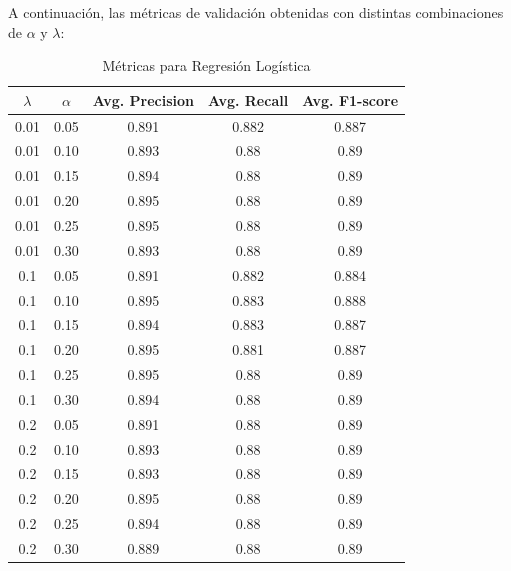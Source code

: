 \documentclass[conference]{IEEEtran}
\begin{document}
A continuación, las métricas de validación obtenidas con distintas combinaciones de $\alpha$ y $\lambda$:

\begin{table}[ht]
    \centering
    \begin{tabular}{ccccc}
        \(\lambda\) & \(\alpha\) & \textbf{Avg. Precision} & \textbf{Avg. Recall} & \textbf{Avg. F1-score} \\
        \hline
        0.01 & 0.05 & 0.891 & 0.882 & 0.887 \\
        0.01 & 0.10 & 0.893 & 0.88 & 0.89 \\
        0.01 & 0.15 & 0.894 & 0.88 & 0.89 \\
        0.01 & 0.20 & 0.895 & 0.88 & 0.89 \\
        0.01 & 0.25 & 0.895 & 0.88 & 0.89 \\
        0.01 & 0.30 & 0.893 & 0.88 & 0.89 \\
        \hline
        0.1 & 0.05 & 0.891 & 0.882 & 0.884 \\
        0.1 & 0.10 & 0.895 & 0.883 & 0.888 \\
        0.1 & 0.15 & 0.894 & 0.883 & 0.887 \\
        0.1 & 0.20 & 0.895 & 0.881 & 0.887 \\
        0.1 & 0.25 & 0.895 & 0.88 & 0.89 \\
        0.1 & 0.30 & 0.894 & 0.88 & 0.89 \\
        \hline 
        0.2 & 0.05 & 0.891 & 0.88 & 0.89 \\
        0.2 & 0.10 & 0.893 & 0.88 & 0.89 \\
        0.2 & 0.15 & 0.893 & 0.88 & 0.89 \\
        0.2 & 0.20 & 0.895 & 0.88 & 0.89 \\
        0.2 & 0.25 & 0.894 & 0.88 & 0.89 \\
        0.2 & 0.30 & 0.889 & 0.88 & 0.89 \\
    \end{tabular}
    \caption{Métricas para Regresión Logística} 
    \label{tab:rl1}
\end{table}
\end{document}
